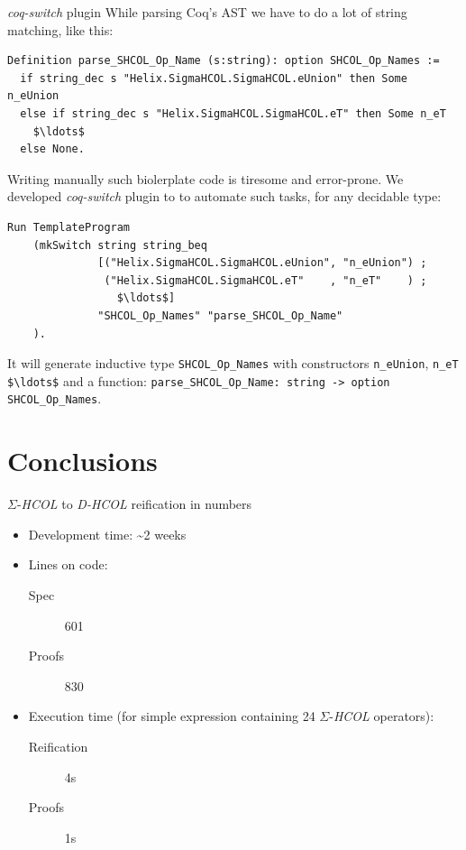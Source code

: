 \documentclass[aspectratio=169]{beamer}
\newcommand{\SHCOL}{\texorpdfstring{$\Sigma$-\emph{HCOL}}{Sigma-HCOL}}
\newcommand{\DHCOL}{\emph{D-HCOL}}
\begin{document}
\begin{frame}[fragile]{\emph{coq-switch} plugin}
  While parsing Coq's AST we have to do a lot of string matching, like
  this:
  \begin{lstlisting}[language=Coq, mathescape=true, frame=single,
    basicstyle=\scriptsize]
Definition parse_SHCOL_Op_Name (s:string): option SHCOL_Op_Names :=
  if string_dec s "Helix.SigmaHCOL.SigmaHCOL.eUnion" then Some n_eUnion
  else if string_dec s "Helix.SigmaHCOL.SigmaHCOL.eT" then Some n_eT
    $\ldots$
  else None.    
\end{lstlisting}

Writing manually such biolerplate code is tiresome and error-prone. We
developed \emph{coq-switch} plugin to to automate such tasks, for any
decidable type:

\begin{lstlisting}[language=Coq, mathescape=true, frame=single, basicstyle=\scriptsize]
  Run TemplateProgram
    (mkSwitch string string_beq
              [("Helix.SigmaHCOL.SigmaHCOL.eUnion", "n_eUnion") ;
               ("Helix.SigmaHCOL.SigmaHCOL.eT"    , "n_eT"    ) ;
                 $\ldots$]
              "SHCOL_Op_Names" "parse_SHCOL_Op_Name"
    ).
\end{lstlisting}

It will generate inductive type \lstinline[language=Coq]{SHCOL_Op_Names}
with constructors \lstinline[language=Coq]{n_eUnion}, \lstinline[language=Coq]{n_eT $\ldots$} and a
function: \lstinline[language=Coq]{parse_SHCOL_Op_Name: string -> option SHCOL_Op_Names}.

\end{frame}

\section{Conclusions}

\begin{frame}{{\SHCOL} to {\DHCOL} reification in numbers}
  \begin{itemize}
  \item Development time: \textasciitilde 2 weeks
  \item Lines on code:
    \begin{description}
    \item[Spec] 601
    \item[Proofs] 830
    \end{description}
  \item Execution time (for simple expression containing 24 {\SHCOL} operators):
    \begin{description}
    \item[Reification] 4s
    \item[Proofs] 1s
    \end{description}
\end{itemize}
  

\end{frame}
    
\end{document}
